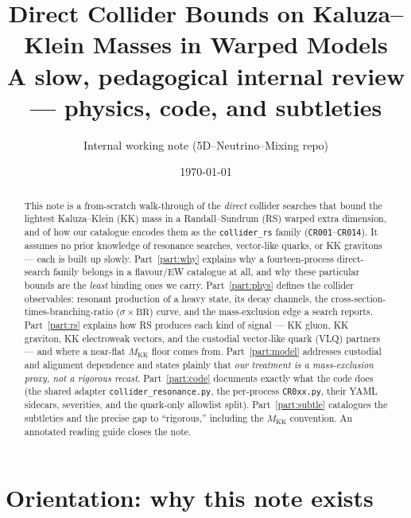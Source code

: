 \documentclass[11pt]{article}
\title{\bf Direct Collider Bounds on Kaluza--Klein Masses in Warped Models\\[4pt]
\large A slow, pedagogical internal review --- physics, code, and subtleties}
\author{Internal working note (5D--Neutrino--Mixing repo)}
\date{\today}
\newcommand{\MKK}{M_{\mathrm{KK}}}
\newcommand{\sBR}{\sigma\!\times\!\mathrm{BR}}
\newcommand{\code}[1]{\texttt{#1}}
\theoremstyle{definition}
\begin{document}
\maketitle

\begin{abstract}
\noindent
This note is a from-scratch walk-through of the \emph{direct} collider searches
that bound the lightest Kaluza--Klein (KK) mass in a Randall--Sundrum (RS)
warped extra dimension, and of how our catalogue encodes them as the
\code{collider\_rs} family (\code{CR001}--\code{CR014}). It assumes no prior
knowledge of resonance searches, vector-like quarks, or KK gravitons --- each is
built up slowly. Part~\ref{part:why} explains why a fourteen-process direct-search
family belongs in a flavour/EW catalogue at all, and why these particular bounds
are the \emph{least} binding ones we carry. Part~\ref{part:phys} defines the
collider observables: resonant production of a heavy state, its decay channels,
the cross-section-times-branching-ratio ($\sBR$) curve, and the mass-exclusion
edge a search reports. Part~\ref{part:rs} explains how RS produces each kind of
signal --- KK gluon, KK graviton, KK electroweak vectors, and the custodial
vector-like quark (VLQ) partners --- and where a near-flat $\MKK$ floor comes
from. Part~\ref{part:model} addresses custodial and alignment dependence and
states plainly that \emph{our treatment is a mass-exclusion proxy, not a
rigorous recast}. Part~\ref{part:code} documents exactly what the code does
(the shared adapter \code{collider\_resonance.py}, the per-process
\code{CR0xx.py}, their YAML sidecars, severities, and the quark-only allowlist
split). Part~\ref{part:subtle} catalogues the subtleties and the precise gap to
``rigorous,'' including the $\MKK$ convention. An annotated reading guide closes
the note.
\end{abstract}

\tableofcontents

\part*{Orientation: why this note exists}
\label{part:why}
\end{document}
